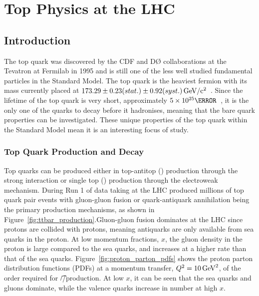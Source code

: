\chapter{Top Physics at the LHC}
\label{c:top_physics_at_the_lhc}

\section{Introduction}
\label{s:top_physics_intro}
The top quark was discovered by the CDF and D{\O} collaborations at the Tevatron at Fermilab in 1995
\cite{Abe:1995hr, Abachi:1995iq} and is still one of the less well studied fundamental particles in the
Standard Model. The top quark is the heaviest fermion with its mass currently placed at $173.29 \pm 0.23
(stat.) \pm 0.92 (syst.)\mathrm{\,\text{Ge\hspace{-.08em}V}/c^{2}}$~\cite{top_mass}. Since the lifetime of the top quark is very
short, approximately $5 \times 10^{25}\mathrm{\s}$~\cite{Agashe:2014kda}, it is the only one of the quarks to
decay before it hadronises, meaning that the bare quark properties can be investigated. These unique
properties of the top quark within the Standard Model mean it is an interesting focus of study.

\subsection{Top Quark Production and Decay}
\label{ss:top_quark_production_and_decay}
Top quarks can be produced either in top-antitop (\ttbar) production through the strong interaction or single
top (\tquark) production through the electroweak mechanism. During Run 1 of data taking at the LHC produced
millions of top quark pair events with gluon-gluon fusion or quark-antiquark annihilation being the primary
production mechanisms, as shown in Figure~\ref{fig:ttbar_production}.Gluon-gluon fusion dominates at the LHC
since protons are collided with protons, meaning antiquarks are only available from sea quarks in the proton.
At low momentum fractions, $x$, the gluon density in the proton is large compared to the sea quarks, and
increases at a higher rate than that of the sea quarks. Figure~\ref{fig:proton_parton_pdfs} shows the proton
parton distribution functions (PDFs) at a momentum transfer, $Q^{2}=10\,\text{Ge\hspace{-.08em}V}^{2}$, of the order required for
\t/\W/\Z production. At low $x$, it can be seen that the sea quarks and gluons dominate, while the valence
quarks increase in number at high $x$.

